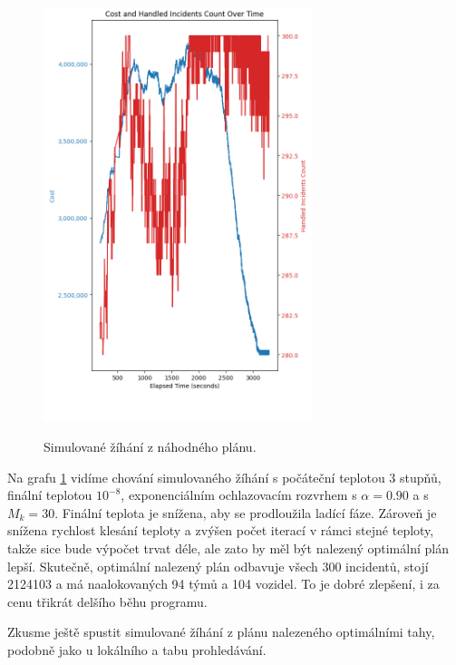 \begin{figure}[H]
  \caption{Simulované žíhání z náhodného plánu.}
  \includegraphics[width=0.7\textwidth,height=0.9\textwidth]{img/plots/sa_random_90.png}
  \centering
  \label{img:sa_random}
\end{figure}

Na grafu \ref{img:sa_random} vidíme chování simulovaného žíhání
s počáteční teplotou 3 stupňů, finální teplotou $10^{-8}$, exponenciálním ochlazovacím rozvrhem s $\alpha = 0.90$ a s $M_k = 30$.
Finální teplota je snížena, aby se prodloužila ladící fáze.
Zároveň je snížena rychlost klesání teploty a zvýšen počet iterací v rámci stejné teploty, takže sice bude výpočet trvat déle, ale zato by měl být nalezený optimální plán lepší.
Skutečně, optimální nalezený plán odbavuje všech 300 incidentů, stojí 2124103 a má naalokovaných 94 týmů a 104 vozidel.
To je dobré zlepšení, i za cenu třikrát delšího běhu programu.

Zkusme ještě spustit simulované žíhání z plánu nalezeného optimálními tahy, podobně jako u lokálního a tabu prohledávání.

